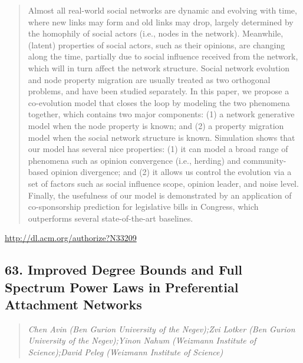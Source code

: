 \documentclass{article}
\begin{document}
\begin{quote}
Almost all real-world social networks are dynamic and evolving with time, where new links may form and old links may drop, largely determined by the homophily of social actors (i.e., nodes in the network). Meanwhile, (latent) properties of social actors, such as their opinions, are changing along the time, partially due to social influence received from the network, which will in turn affect the network structure. Social network evolution and node property migration are usually treated as two orthogonal problems, and have been studied separately. In this paper, we propose a co-evolution model that closes the loop by modeling the two phenomena together, which contains two major components: (1) a network generative model when the node property is known; and (2) a property migration model when the social network structure is known. Simulation shows that our model has several nice properties: (1) it can model a broad range of phenomena such as opinion convergence (i.e., herding) and community-based opinion divergence; and (2) it allows us control the evolution via a set of factors such as social influence scope, opinion leader, and noise level. Finally, the usefulness of our model is demonstrated by an application of co-sponsorship prediction for legislative bills in Congress, which outperforms several state-of-the-art baselines.
\end{quote}

\href{http://dl.acm.org/authorize?N33209}{http://dl.acm.org/authorize?N33209}

\subsection{63. Improved Degree Bounds and Full Spectrum Power Laws in Preferential Attachment Networks}

\begin{quote}
\footnotesize{\textit{Chen Avin (Ben Gurion University of the Negev);Zvi Lotker (Ben Gurion University of the Negev);Yinon Nahum (Weizmann Institute of Science);David Peleg (Weizmann Institute of Science)}}

\end{quote}
\end{document}
